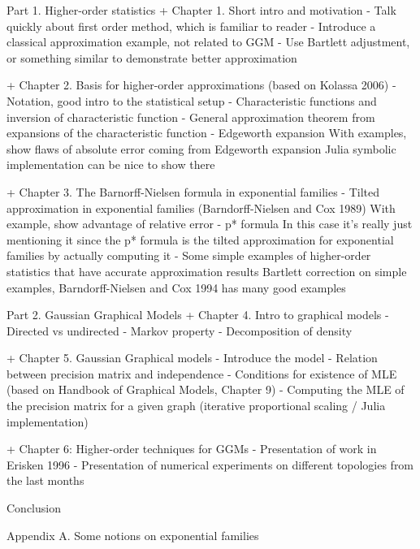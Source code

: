 Part 1. Higher-order statistics
    + Chapter 1. Short intro and motivation
        - Talk quickly about first order method, which is familiar to reader
        - Introduce a classical approximation example, not related to GGM
        - Use Bartlett adjustment, or something similar to demonstrate better approximation

    + Chapter 2. Basis for higher-order approximations (based on Kolassa 2006)
        - Notation, good intro to the statistical setup
        - Characteristic functions and inversion of characteristic function
        - General approximation theorem from expansions of the characteristic function 
        - Edgeworth expansion
            With examples, show flaws of absolute error coming from Edgeworth expansion
            Julia symbolic implementation can be nice to show there

    + Chapter 3. The Barnorff-Nielsen formula in exponential families
        - Tilted approximation in exponential families (Barndorff-Nielsen and Cox 1989)
            With example, show advantage of relative error
        - p* formula
            In this case it's really just mentioning it since the p* formula is the tilted approximation for exponential families by actually computing it
        - Some simple examples of higher-order statistics that have accurate approximation results
            Bartlett correction on simple examples, Barndorff-Nielsen and Cox 1994 has many good examples
    
Part 2. Gaussian Graphical Models
    + Chapter 4. Intro to graphical models
        - Directed vs undirected
        - Markov property
        - Decomposition of density

    + Chapter 5. Gaussian Graphical models
        - Introduce the model
        - Relation between precision matrix and independence
        - Conditions for existence of MLE (based on Handbook of Graphical Models, Chapter 9)
        - Computing the MLE of the precision matrix for a given graph (iterative proportional scaling / Julia implementation)

    + Chapter 6: Higher-order techniques for GGMs
        - Presentation of work in Erisken 1996
        - Presentation of numerical experiments on different topologies from the last months

Conclusion

Appendix A. Some notions on exponential families



